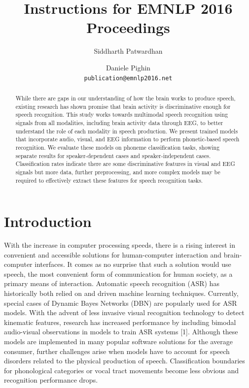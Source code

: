 \documentclass[11pt,letterpaper]{article}
\title{Instructions for EMNLP 2016 Proceedings\Thanks{This
    document has been adapted from the instructions for earlier ACL
    and NAACL proceedings.}}
\author{Siddharth Patwardhan \and Daniele Pighin\\
  {\tt publication@emnlp2016.net}}
\date{}
\begin{document}
\maketitle

\begin{abstract}
  While there are gaps in our understanding of how the brain works to produce speech, existing research has shown promise that brain activity is discriminative enough for speech recognition. This study works towards multimodal speech recognition using signals from all modalities, including brain activity data through EEG, to better understand the role of each modality in speech production. We present trained models that incorporate audio, visual, and EEG information to perform phonetic-based speech recognition. We evaluate these models on phoneme classification tasks, showing separate results for speaker-dependent cases and speaker-independent cases. Classification rates indicate there are some discriminative features in visual and EEG signals but more data, further preprocessing, and more complex models may be required to effectively extract these features for speech recognition tasks.
\end{abstract}


\section{Introduction}

With the increase in computer processing speeds, there is a rising interest in convenient and accessible solutions for human-computer interaction and brain-computer interfaces. It comes as no surprise that such a solution would use speech, the most convenient form of communication for human society, as a primary means of interaction. Automatic speech recognition (ASR) has historically both relied on and driven machine learning techniques. Currently, special cases of Dynamic Bayes Networks (DBN) are popularly used for ASR models. With the advent of less invasive visual recognition technology to detect kinematic features, research has increased performance by including bimodal audio-visual observations in models to train ASR systems [1]. Although these models are implemented in many popular software solutions for the average consumer, further challenges arise when models have to account for speech disorders related to the physical production of speech. Classification boundaries for phonological categories or vocal tract movements become less obvious and recognition performance drops.
\end{document}
